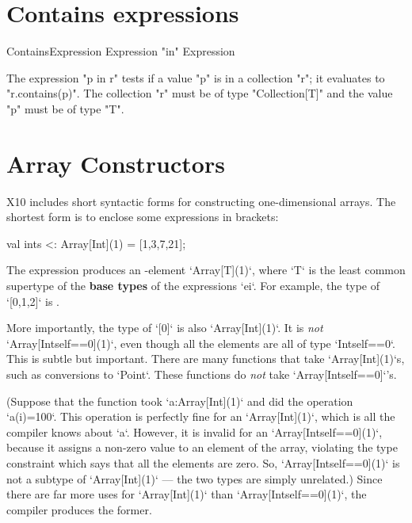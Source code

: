 \section{Contains expressions}

\begin{grammar}
ContainsExpression \: Expression \xcd"in" Expression \\
\end{grammar}

The expression \xcd"p in r" tests if a value \xcd"p" is in a collection
\xcd"r"; it evaluates to \xcd"r.contains(p)".
The collection \xcd"r"
must be of type \xcd"Collection[T]" and the value \xcd"p" must
be of type \xcd"T".

\section{Array Constructors}
\label{sect:ArrayCtors}

X10 includes short syntactic forms for constructing one-dimensional arrays.
The shortest form is to enclose some expressions in brackets: 
\begin{xten}
val ints <: Array[Int](1) = [1,3,7,21];
\end{xten}

The expression \Xcd{[e1,e2,e3, ..., en]} produces an -element
\xcd`Array[T](1)`, where \xcd`T` is the least common supertype of the {\bf
  base types} of the expressions \xcd`ei`. For example, the type of
\xcd`[0,1,2]` is .    

More importantly, the type of 
\xcd`[0]` is also \xcd`Array[Int](1)`.  It is {\em not} 
\xcd`Array[Int{self==0}](1)`, even though all the elements are all 
of type \xcd`Int{self==0}`.  This is subtle but important. There are many
functions that take \xcd`Array[Int](1)`s, such as conversions to \xcd`Point`.
These functions do {\em not} take
\xcd`Array[Int{self==0}]`'s.

(Suppose that the function took \xcd`a:Array[Int](1)` and did 
the operation \xcd`a(i)=100`.   This operation is perfectly fine for
an \xcd`Array[Int](1)`, which is all the compiler knows about \xcd`a`.  
However, it is invalid for an \xcd`Array[Int{self==0}](1)`, because it assigns
a non-zero value to an element of the array, violating the type constraint
which says that all the elements are zero.  So, \xcd`Array[Int{self==0}](1)`
is not a subtype of \xcd`Array[Int](1)` --- the two types are simply unrelated.)
Since there are far more uses for \xcd`Array[Int](1)` than
\xcd`Array[Int{self==0}](1)`, the compiler produces the former.

